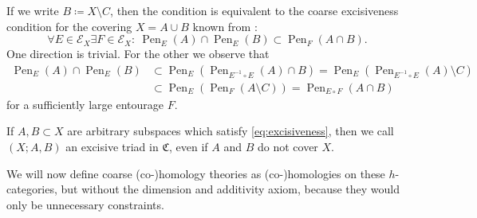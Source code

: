 \documentclass[pdftex]{sigma}
\numberwithin{equation}{section}
\theoremstyle{definition}
\newcommand{\coarseStr}{\mathcal{E}}
\DeclareMathOperator{\Pen}{Pen}
\newcommand{\admissible}{{\mathfrak{C}}}
\begin{document}
If we write $B\coloneqq X\setminus C$, then the condition is equivalent to the coarse excisiveness condition for the covering $X=A\cup B$ known from \cite{HigsonRoeYuMayerVietoris}:
\begin{equation}\label{eq:excisiveness}
\forall E\in\coarseStr_X\exists F\in\coarseStr_X\colon\ \Pen_E(A)\cap \Pen_E(B)\subset \Pen_F(A\cap B).
\end{equation}
One direction is trivial. For the other we observe that
\begin{align*}
\Pen_E(A)\cap\Pen_E(B)&\subset\Pen_E(\Pen_{E^{-1}\circ E}(A)\cap B)
=\Pen_E(\Pen_{E^{-1}\circ E}(A)\setminus C)
\\
&\subset\Pen_E(\Pen_F(A\setminus C))=\Pen_{E\circ F}(A\cap B)
\end{align*}
for a sufficiently large entourage $F$.

If $A,B\subset X$ are arbitrary subspaces which satisfy \eqref{eq:excisiveness}, then we call $(X;A,B)$ an excisive triad in $\admissible$, even if $A$ and $B$ do not cover $X$.

We will now define coarse \mbox{(co-)}homology theories as \mbox{(co-)}homologies on these $h$-categories, but without the dimension and additivity axiom, because they would only be unnecessary constraints.
\end{document}

